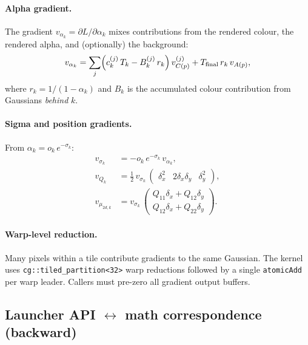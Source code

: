 \documentclass[11pt]{article}
\begin{document}
\paragraph{Alpha gradient.}
The gradient $v_{\alpha_k} = \partial L / \partial \alpha_k$ mixes
contributions from the rendered colour, the rendered alpha, and
(optionally) the background:
\begin{equation}
  v_{\alpha_k} = \sum_{j} \Bigl(c_k^{(j)}\, T_k - B_k^{(j)}\, r_k\Bigr)\,
  v_{C(p)}^{(j)}
  + T_{\text{final}}\, r_k\, v_{A(p)},
  \label{eq:rast-bwd-alpha}
\end{equation}
where $r_k = 1 / (1 - \alpha_k)$ and $B_k$ is the accumulated colour
contribution from Gaussians \emph{behind} $k$.

\paragraph{Sigma and position gradients.}
From $\alpha_k = o_k\, e^{-\sigma_k}$:
\begin{align}
  v_{\sigma_k} &= -o_k\, e^{-\sigma_k}\, v_{\alpha_k},
  \label{eq:rast-bwd-sigma}\\
  v_{Q_k} &= \tfrac{1}{2}\, v_{\sigma_k}\,
  \begin{pmatrix} \delta_x^2 & 2\delta_x \delta_y & \delta_y^2 \end{pmatrix},
  \label{eq:rast-bwd-conic}\\
  v_{\mu_{2d,k}} &= v_{\sigma_k}\,
  \begin{pmatrix} Q_{11}\delta_x + Q_{12}\delta_y \\
  Q_{12}\delta_x + Q_{22}\delta_y \end{pmatrix}.
  \label{eq:rast-bwd-mean}
\end{align}

\paragraph{Warp-level reduction.}
Many pixels within a tile contribute gradients to the same Gaussian.
The kernel uses \texttt{cg::tiled\_partition<32>} warp reductions
followed by a single \texttt{atomicAdd} per warp leader. Callers
must pre-zero all gradient output buffers.

\subsection{Launcher API \texorpdfstring{$\leftrightarrow$}{<->} math correspondence (backward)}
\end{document}
